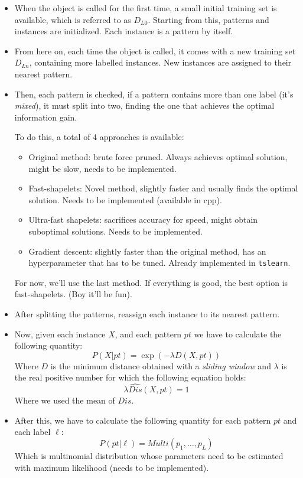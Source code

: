 \begin{itemize}
    \item When the object is called for the first time, a small initial training set
    is available, which is referred to as $D_{L0}$. Starting from this, patterns and 
    instances are initialized. Each instance is a pattern by itself.
    \item From here on, each time the object is called, it comes with a new training
    set $D_{Ln}$, containing more labelled instances. New instances are assigned to 
    their nearest pattern.
    \item Then, each pattern is checked, if a pattern contains more than one label 
    (it's \textit{mixed}), it must split into two, finding the one that achieves 
    the optimal information gain. 

    To do this, a total of 4 approaches is available:
    \begin{itemize}
        \item Original method: brute force pruned. Always achieves optimal solution, might be slow, 
        needs to be implemented.
        \item Fast-shapelets: Novel method, slightly faster and usually finds the optimal solution.
        Needs to be implemented (available in cpp). 
        \item Ultra-fast shapelets: sacrifices accuracy for speed, might obtain suboptimal solutions. 
        Needs to be implemented.
        \item Gradient descent: slightly faster than the original method, has an hyperparameter that has
        to be tuned. Already implemented in \texttt{tslearn}. 
    \end{itemize}
    For now, we'll use the last method. If everything is good, the best option is fast-shapelets. (Boy it'll be fun).
    \item After splitting the patterns, reassign each instance to its nearest pattern.
    \item Now, given each instance $X$, and each pattern $pt$ we have to calculate the following quantity:
    \begin{equation}
        P(X | pt) = \exp(-\lambda D(X, pt))
        \label{eq:pxpt}
    \end{equation}
    Where $D$ is the minimum distance obtained with a \textit{sliding window} and $\lambda$ is the real positive 
    number for which the following equation holds:
    \begin{equation}
        \lambda \hat{Dis}(X, pt) = 1
    \end{equation}
    Where we used the mean of $Dis$.
    \item After this, we have to calculate the following quantity for each pattern $pt$ and each label $\ell$:
    \begin{equation}
        P(pt | \ell) = Multi(p_1, \dots, p_L)
    \end{equation}
    Which is multinomial distribution whose parameters need to be estimated with maximum likelihood 
    (needs to be implemented).
\end{itemize}

